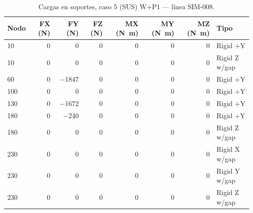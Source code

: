 \begin{table}[htbp]
  \centering
  \footnotesize
  \caption{Cargas en soportes, caso 5 (SUS) W+P1 — línea SIM-008.}
  \label{tab:restricciones-sus}
  \begin{tabular}{lrrrrrrl}
    \toprule
    Nodo & FX (\si{N}) & FY (\si{N}) & FZ (\si{N}) & MX (\si{N.m}) & MY (\si{N.m}) & MZ (\si{N.m}) & Tipo \\
    \midrule
    10 & \num{0} & \num{0} & \num{0} & \num{0} & \num{0} & \num{0} & Rigid +Y \\
    10 & \num{0} & \num{0} & \num{0} & \num{0} & \num{0} & \num{0} & Rigid Z w/gap \\
    60 & \num{0} & \num{-1847} & \num{0} & \num{0} & \num{0} & \num{0} & Rigid +Y \\
    100 & \num{0} & \num{0} & \num{0} & \num{0} & \num{0} & \num{0} & Rigid +Y \\
    130 & \num{0} & \num{-1672} & \num{0} & \num{0} & \num{0} & \num{0} & Rigid +Y \\
    180 & \num{0} & \num{-240} & \num{0} & \num{0} & \num{0} & \num{0} & Rigid +Y \\
    180 & \num{0} & \num{0} & \num{0} & \num{0} & \num{0} & \num{0} & Rigid Z w/gap \\
    230 & \num{0} & \num{0} & \num{0} & \num{0} & \num{0} & \num{0} & Rigid X w/gap \\
    230 & \num{0} & \num{0} & \num{0} & \num{0} & \num{0} & \num{0} & Rigid Y w/gap \\
    230 & \num{0} & \num{0} & \num{0} & \num{0} & \num{0} & \num{0} & Rigid Z w/gap \\
    \bottomrule
  \end{tabular}
\end{table}
